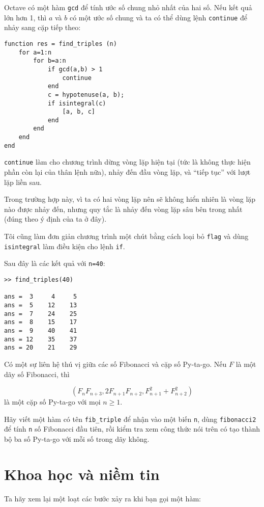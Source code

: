 \documentclass[12pt]{book}
\begin{document}
Octave có một hàm {\tt gcd} để tính ước số chung nhỏ nhất
của hai số. Nếu kết quả lớn hơn 1, thì $a$ và $b$ có một 
ước số chung và ta có thể dùng lệnh {\tt continue} để
nhảy sang cặp tiếp theo:

\begin{verbatim}
function res = find_triples (n)
    for a=1:n
        for b=a:n
            if gcd(a,b) > 1
                continue
            end
            c = hypotenuse(a, b);
            if isintegral(c)
                [a, b, c]
            end
        end
    end
end
\end{verbatim}
%
{\tt continue} làm cho chương trình dừng vòng lặp hiện tại
(tức là không thực hiện phần còn lại của thân lệnh nữa), 
nhảy đến đầu vòng lặp, và ``tiếp tục'' với lượt lặp liền sau.

Trong trường hợp này, vì ta có hai vòng lặp nên sẽ không hiển
nhiên là vòng lặp nào được nhảy đến, nhưng quy tắc là nhảy đến
vòng lặp sâu bên trong nhất (đúng theo ý định của ta ở đây).

Tôi cũng làm đơn giản chương trình một chút bằng cách loại bỏ
{\tt flag} và dùng {\tt isintegral} làm điều kiện cho lệnh
{\tt if}.

Sau đây là các kết quả với {\tt n=40}:

\begin{verbatim}
>> find_triples(40)

ans =  3     4     5
ans =  5    12    13
ans =  7    24    25
ans =  8    15    17
ans =  9    40    41
ans = 12    35    37
ans = 20    21    29
\end{verbatim}
%
Có một sự liên hệ thú vị giữa các số Fibonacci và cặp số
Py-ta-go. Nếu $F$ là một dãy số Fibonacci, thì

\[ (F_n F_{n+3}, 2 F_{n+1} F_{n+2}, F_{n+1}^2 + F_{n+2}^2 ) \]
%
 là một cặp số Py-ta-go với mọi $n \ge 1$.

\begin{ex}
Hãy viết một hàm có tên \verb#fib_triple# để nhận vào một
biến {\tt n}, dùng {\tt fibonacci2} để tính
{\tt n} số Fibonacci đầu tiên, rồi kiểm tra xem công thức
nói trên có tạo thành bộ ba số Py-ta-go với mỗi số trong 
dãy không.
\end{ex}



\section{Khoa học và niềm tin}

Ta hãy xem lại một loạt các bước xảy ra khi bạn gọi một hàm:
\end{document}
